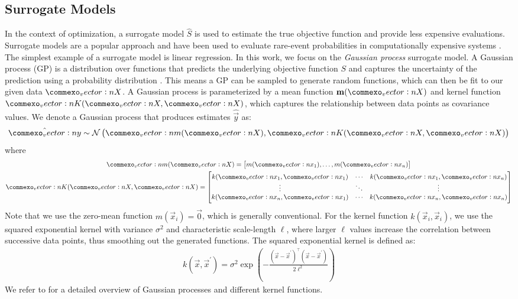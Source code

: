 \subsection{Surrogate Models}
In the context of optimization, a surrogate model $\hat{S}$ is used to estimate the true objective function and provide less expensive evaluations.
Surrogate models are a popular approach and have been used to evaluate rare-event probabilities in computationally expensive systems \cite{li2010evaluation,li2011efficient}.
The simplest example of a surrogate model is linear regression.
In this work, we focus on the \textit{Gaussian process} surrogate model.
A Gaussian process (GP) is a distribution over functions that predicts the underlying objective function $S$ and captures the uncertainty of the prediction using a probability distribution \cite{kochenderfer2019algorithms}.
This means a GP can be sampled to generate random functions, which can then be fit to our given data $\mat{X}$.
A Gaussian process is parameterized by a mean function $\m(\mat{X})$ and kernel function $\mat{K}(\mat{X},\mat{X})$, which captures the relationship between data points as covariance values.
We denote a Gaussian process that produces estimates $\hat{\vec{y}}$ as:
\begin{equation*}
\hat{\vec{y}} \sim\mathcal{N}\left(\vec{m}(\mat{X}),\vec{K}(\mat{X},\mat{X})\right)
\end{equation*}
where
\begin{gather*}
\vec{m}(\mat{X}) = \begin{bmatrix} m(\vec{x}_1), \ldots, m(\vec{x}_n) \end{bmatrix}\\
\vec{K}(\mat{X}, \mat{X}) = \begin{bmatrix}
         k(\vec{x}_1, \vec{x}_1) & \cdots & k(\vec{x}_1, \vec{x}_n)\\
         \vdots & \ddots & \vdots\\
         k(\vec{x}_n, \vec{x}_1) & \cdots & k(\vec{x}_n, \vec{x}_n)
     \end{bmatrix}
\end{gather*}
Note that we use the zero-mean function $m(\vec{x}_i) = \vec{0}$, which is generally conventional.
For the kernel function $k(\vec{x}_i, \vec{x}_i)$, we use the squared exponential kernel with variance $\sigma^2$ and characteristic scale-length $\ell$, where larger $\ell$ values increase the correlation between successive data points, thus smoothing out the generated functions. The squared exponential kernel is defined as:
\begin{align*}
k(\vec{x},\vec{x}^\prime) = \sigma^2\exp\left(- \frac{(\vec{x} - \vec{x}^\prime)^\top(\vec{x} - \vec{x}^\prime)}{2\ell^2}\right)
\end{align*}
We refer to \cite{kochenderfer2019algorithms} for a detailed overview of Gaussian processes and different kernel functions.



